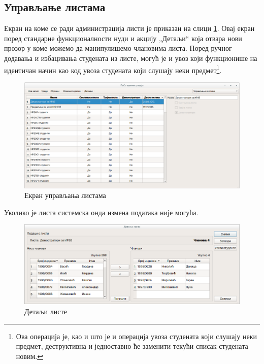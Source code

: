 \documentclass[a4paper, 12pt, diplomski]{etfcyr}
\def\quote#1{„#1“}
\begin{document}
			\newpage

			\subsection{Управљање листама}
				\begin{justify}
					Екран на коме се ради администрација листи је приказан на слици \ref{figure:lists_main_window}. Овај екран поред стандарне функционалности нуди и акцију \quote{Детаљи} која отвара нови прозор у коме можемо да манипулишемо члановима листа. Поред ручног додавања и избацивања студената из листе, могућ је и увоз који функционише на идентичан начин као код увоза студената који слушају неки предмет\footnote{Ова операција је, као и што је и операција увоза студената који слушају неки предмет, деструктивна и једноставно ће заменити текући списак студената новим.}.
					\begin{figure}[h]
						\begin{center}
							\includegraphics[width=1.0\textwidth]{manual/lists_main_window.png}
						\end{center}
						\caption{Екран управљања листама}
						\label{figure:lists_main_window}
					\end{figure}
					Уколико је листа системска онда измена података није могућа.
					\begin{figure}[h]
						\begin{center}
							\includegraphics[width=.95\textwidth]{manual/list_details_dialog.png}
						\end{center}
						\caption{Детаљи листе}
						\label{figure:list_details_dialog}
					\end{figure}
				\end{justify}
\end{document}

